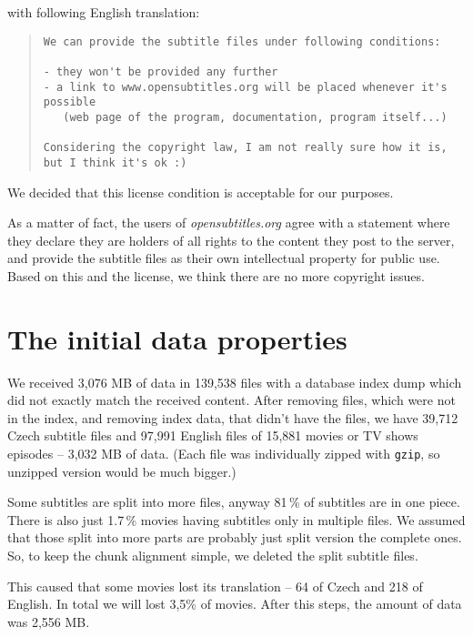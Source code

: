 \noindent with following English translation:

\begin{quote}
\begin{verbatim}
We can provide the subtitle files under following conditions:

- they won't be provided any further
- a link to www.opensubtitles.org will be placed whenever it's possible 
   (web page of the program, documentation, program itself...)

Considering the copyright law, I am not really sure how it is, 
but I think it's ok :)
\end{verbatim}
\end{quote}


\noindent We decided that this license condition is acceptable for our purposes. 

As a matter of fact, the users of \emph{opensubtitles.org} agree with a statement where they declare they are holders of all rights to the content they post to the server, and provide the subtitle files as their own intellectual property for public use. Based on this and the license, we think there are no more copyright issues.%


\section{The initial data properties}

We received 3,076 MB of data in 139,538 files with a database index dump which did not exactly match the received content. After removing files, which were not in the index, and removing index data, that didn't have the files, we have 39,712 Czech subtitle files and 97,991 English files of 15,881 movies or TV shows episodes -- 3,032 MB of data. (Each file was individually zipped with \texttt{gzip}, so unzipped version would be much bigger.)

Some subtitles are split into more files, anyway 81\,\% of subtitles are in one piece. There is also just 1.7\,\% movies having subtitles only in multiple files. We assumed that those split into more parts are probably just split version the complete ones. So, to keep the chunk alignment simple, we deleted the split subtitle files.

This caused that some movies lost its translation -- 64
of Czech and 218 of English. In total we will lost 3,5\% of movies. After this steps, the amount of data was 2,556 MB.

